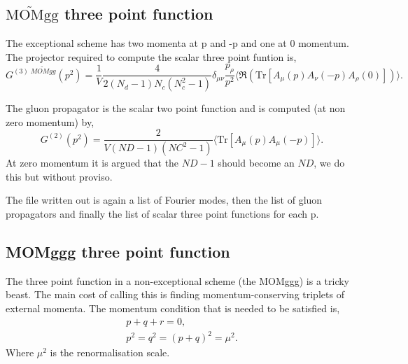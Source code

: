 \documentclass[12pt]{article}
\begin{document}
\subsection{\texorpdfstring{$\widetilde{\text{MOMgg}}$}{MOMgg} three point function}

The exceptional scheme has two momenta at p and -p and one at 0 momentum. The projector required to compute the scalar three point funtion is,
\begin{equation}
 G^{(3) \;\widetilde{MOMgg}}(p^2) = \frac{1}{V} \frac{4}{2(N_d-1)N_c(N_c^2-1)}
\delta_{\mu\nu}
\frac{p_{\rho}}{p^2}
\langle{\Re\left(\textrm{Tr}\left[A_\mu(p)A_\nu(-p)A_\rho(0)\right]\right)\rangle}.
\end{equation}

The gluon propagator is the scalar two point function and is computed (at non zero momentum) by,
\begin{equation}
 G^{(2)}(p^2) = \frac{2}{V(ND-1)(NC^2-1)}\langle\text{Tr}\left[ A_\mu(p) A_\mu(-p) \right]\rangle.
\end{equation}
At zero momentum it is argued that the $ND-1$ should become an $ND$, we do this but without proviso.

The file written out is again a list of Fourier modes, then the list of gluon propagators and finally the list of scalar three point functions for each p.

\subsection{MOMggg three point function}

The three point function in a non-exceptional scheme (the MOMggg) is a tricky beast. The main cost of calling this is finding momentum-conserving triplets of external momenta. The momentum condition that is needed to be satisfied is,
\begin{equation}
 \begin{gathered}
  p + q + r = 0, \\
  p^2 = q^2 = (p+q)^2 = \mu^2.
 \end{gathered}
\end{equation}
Where $\mu^2$ is the renormalisation scale.
\end{document}
